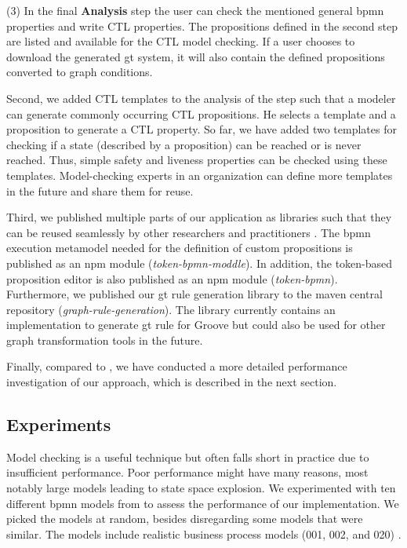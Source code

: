 \documentclass{lmcs} %
\theoremstyle{plain}\newtheorem{satz}[thm]{Satz} %
\begin{document}
(3) In the final \textbf{Analysis} step the user can check the mentioned general \gls*{bpmn} properties and write CTL properties.
The propositions defined in the second step are listed and available for the CTL model checking.
If a user chooses to download the generated \gls*{gt} system, it will also contain the defined propositions converted to graph conditions.

Second, we added CTL templates to the analysis of the step such that a modeler can generate commonly occurring CTL propositions.
He selects a template and a proposition to generate a CTL property.
So far, we have added two templates for checking if a state (described by a proposition) can be reached or is never reached.
Thus, simple safety and liveness properties can be checked using these templates.
Model-checking experts in an organization can define more templates in the future and share them for reuse. 

Third, we published multiple parts of our application as libraries such that they can be reused seamlessly by other researchers and practitioners \cite{krauterArtifactsLMCS2023}.
The \gls*{bpmn} execution metamodel needed for the definition of custom propositions is published as an npm module (\textit{token-bpmn-moddle}).
In addition, the token-based proposition editor is also published as an npm module (\textit{token-bpmn}).
Furthermore, we published our \gls*{gt} rule generation library to the maven central repository (\textit{graph-rule-generation}).
The library currently contains an implementation to generate \gls*{gt} rule for Groove but could also be used for other graph transformation tools in the future.

Finally, compared to \cite{krauterFormalizationAnalysisBPMN2023}, we have conducted a more detailed performance investigation of our approach, which is described in the next section.

\subsection{Experiments}

Model checking is a useful technique but often falls short in practice due to insufficient performance.
Poor performance might have many reasons, most notably large models leading to state space explosion.
We experimented with ten different \gls*{bpmn} models from \cite{houhouFirstOrderLogicVerification2022} to assess the performance of our implementation.
We picked the models at random, besides disregarding some models that were similar.
The models include realistic business process models (001, 002, and 020) \cite{houhouFirstOrderLogicVerification2022}.
\end{document}
